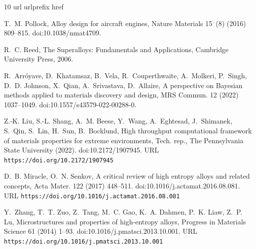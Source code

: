 \documentclass[preprint,12pt,times]{elsarticle}  %
\providecommand{\JournalTitle}[1]{#1}
\begin{document}
\begin{thebibliography}{10}
\expandafter\ifx\csname url\endcsname\relax
  \def\url#1{\texttt{#1}}\fi
\expandafter\ifx\csname urlprefix\endcsname\relax\def\urlprefix{URL }\fi
\expandafter\ifx\csname href\endcsname\relax
  \def\href#1#2{#2} \def\path#1{#1}\fi

T.~M. Pollock, Alloy design for aircraft engines, {\JournalTitle{Nature
  Materials}} 15~(8) (2016) 809--815.
\newblock \href {http://dx.doi.org/10.1038/nmat4709}
  {\path{doi:10.1038/nmat4709}}.

R.~C. Reed, The Superalloys: Fundamentals and Applications, Cambridge
  University Press, 2006.

R.~Arr{\'o}yave, D.~Khatamsaz, B.~Vela, R.~Couperthwaite, A.~Molkeri, P.~Singh,
  D.~D. Johnson, X.~Qian, A.~Srivastava, D.~Allaire, A perspective on
  {Bayesian} methods applied to materials discovery and design,
  {\JournalTitle{MRS Commun.}} 12 (2022) 1037--1049.
\newblock \href {http://dx.doi.org/10.1557/s43579-022-00288-0}
  {\path{doi:10.1557/s43579-022-00288-0}}.

Z.-K. Liu, S.-L. Shang, A.~M. Beese, Y.~Wang, A.~Eghtesad, J.~Shimanek, S.~Qin,
  S.~Lin, H.~Sun, B.~Bocklund, \href{https://doi.org/10.2172/1907945}{High
  throughput computational framework of materials properties for extreme
  environments}, Tech. rep., The Pennsylvania State University (2022).
\newblock \href {http://dx.doi.org/10.2172/1907945}
  {\path{doi:10.2172/1907945}}.
\newline\urlprefix\url{https://doi.org/10.2172/1907945}

D.~B. Miracle, O.~N. Senkov,
  \href{https://doi.org/10.1016/j.actamat.2016.08.081}{A critical review of
  high entropy alloys and related concepts}, {\JournalTitle{Acta Mater.}}
  122 (2017) 448--511.
\newblock \href {http://dx.doi.org/10.1016/j.actamat.2016.08.081}
  {\path{doi:10.1016/j.actamat.2016.08.081}}.
\newline\urlprefix\url{https://doi.org/10.1016/j.actamat.2016.08.081}

Y.~Zhang, T.~T. Zuo, Z.~Tang, M.~C. Gao, K.~A. Dahmen, P.~K. Liaw, Z.~P. Lu,
  \href{https://doi.org/10.1016/j.pmatsci.2013.10.001}{Microstructures and
  properties of high-entropy alloys}, {\JournalTitle{Progress in Materials
  Science}} 61 (2014) 1--93.
\newblock \href {http://dx.doi.org/10.1016/j.pmatsci.2013.10.001}
  {\path{doi:10.1016/j.pmatsci.2013.10.001}}.
\newline\urlprefix\url{https://doi.org/10.1016/j.pmatsci.2013.10.001}


\end{thebibliography}
\end{document}
